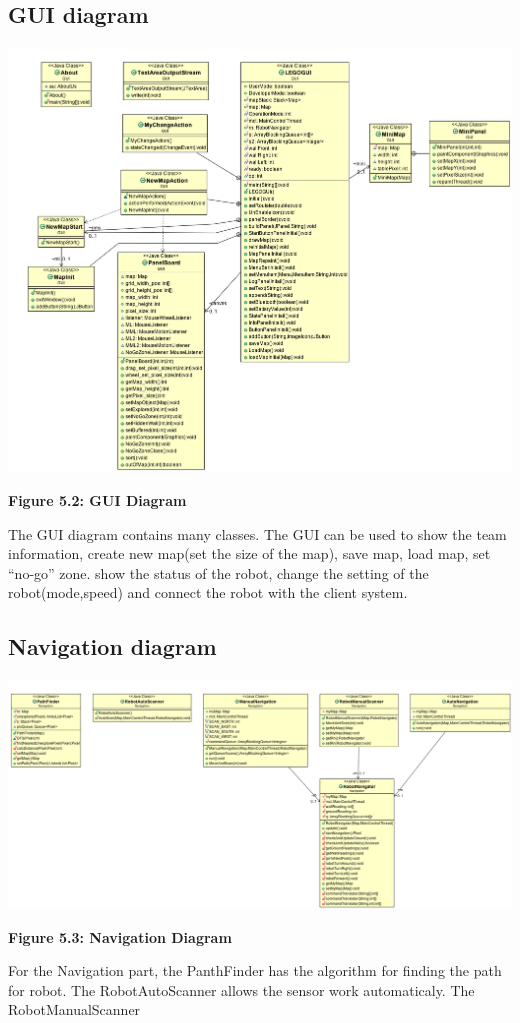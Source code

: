 \documentclass[11pt, a4paper]{report}
\begin{document}
\subsection{GUI diagram}
 \begin{center}
 \includegraphics[width=18.20cm]{GUI.png}
\end{center}
\begin{center}
\textbf {Figure 5.2: GUI Diagram} \\[0.3cm]
\end{center}
The GUI diagram contains many classes. The GUI can be used to show the team information, create new map(set the size of the map), save map, load map, set ``no-go'' zone. show the status of the robot, change the setting of the robot(mode,speed) and connect the robot with the client system. 
\pagebreak
\subsection{Navigation diagram}
 \begin{center}
 \includegraphics[width=18.20cm]{Navigation.png}
\end{center}
\begin{center}
\textbf {Figure 5.3: Navigation Diagram} \\[0.3cm]
\end{center}
For the Navigation part, the PanthFinder has the algorithm for finding the path for robot. The RobotAutoScanner allows the sensor work automaticaly. The RobotManualScanner
\pagebreak
\end{document}
